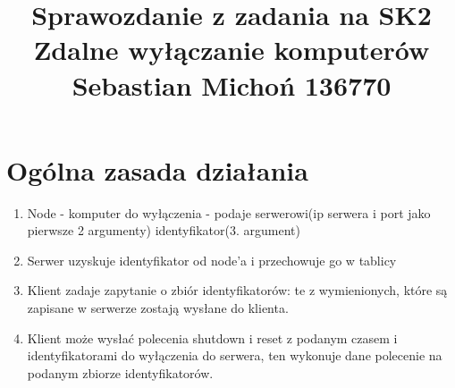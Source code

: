 \documentclass[12pt]{article}
\begin{document}
\title{Sprawozdanie z zadania na SK2\\
\large Zdalne wyłączanie komputerów\\
\large Sebastian Michoń 136770}
\date{\vspace{-10ex}}
\maketitle

\section{Ogólna zasada działania}
\begin {enumerate}
	\item{Node - komputer do wyłączenia - podaje serwerowi(ip serwera i port jako pierwsze 2 argumenty) identyfikator(3. argument)}
	\item{Serwer uzyskuje identyfikator od node'a i przechowuje go w tablicy}
	\item{Klient zadaje zapytanie o zbiór identyfikatorów: te z wymienionych, które są zapisane w serwerze zostają wysłane do klienta.}
	\item{Klient może wysłać polecenia shutdown i reset z podanym czasem i identyfikatorami do wyłączenia do serwera, ten wykonuje dane polecenie na podanym zbiorze identyfikatorów.}
	
\end{enumerate}
\end{document}
